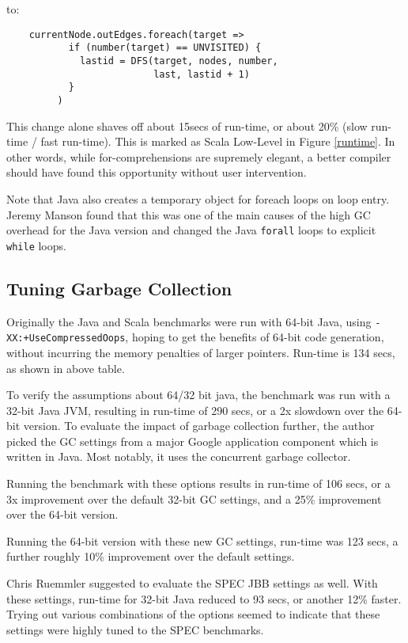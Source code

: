 to:

\begin{footnotesize}
\begin{verbatim}
    currentNode.outEdges.foreach(target => 
           if (number(target) == UNVISITED) {    
             lastid = DFS(target, nodes, number, 
                          last, lastid + 1)
           }
         )
\end{verbatim}
\end{footnotesize}

This change alone shaves off about 15secs of run-time, or about 20\%
(slow run-time / fast run-time). This is marked as Scala Low-Level in
Figure \ref{runtime}. In other words, while for-comprehensions are
supremely elegant, a better compiler should have found this opportunity
without user intervention.

Note that Java also creates a temporary object for foreach loops on
loop entry. Jeremy Manson found that this was one of the main causes
of the high GC overhead for the Java version and changed the 
Java {\tt forall} loops to explicit {\tt while} loops.


\subsection{Tuning Garbage Collection}

Originally the Java and Scala benchmarks were run with 64-bit Java,
using {\tt -XX:+UseCompressedOops}, hoping to get the benefits of
64-bit code generation, without incurring the memory penalties of
larger pointers. Run-time is 134 secs, as shown in above table.

To verify the assumptions about 64/32 bit java, the benchmark was run
with a 32-bit Java JVM, resulting in run-time of 290 secs, or a 2x
slowdown over the 64-bit version. To evaluate the impact of garbage
collection further, the author picked the GC settings from a major
Google application component which is written in Java. Most notably,
it uses the concurrent garbage collector.

Running the benchmark with these options results in run-time of 106
secs, or a 3x improvement over the default 32-bit GC settings, and a
25\% improvement over the 64-bit version.

Running the 64-bit version with these new GC settings, run-time was 123 secs, a 
further roughly 10\% improvement over the default settings.

Chris Ruemmler suggested to evaluate the SPEC JBB settings as
well. With these settings, run-time for 32-bit Java reduced to 93 secs,
or another 12\% faster. Trying out various combinations of the options
seemed to indicate that these settings were highly tuned to the SPEC
benchmarks.

